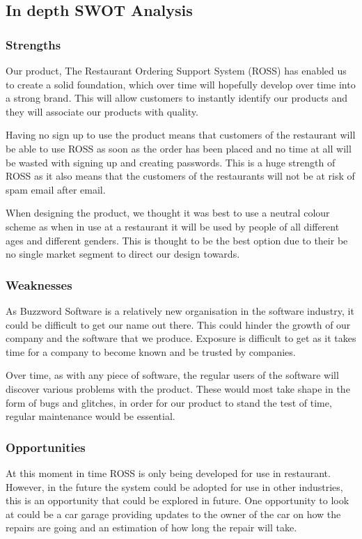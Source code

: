 \documentclass[11pt, oneside, a4paper]{report}   %
\begin{document}
\begin{flushleft}
\subsection{In depth SWOT Analysis}
\subsubsection{Strengths}
Our product, The Restaurant Ordering Support System (ROSS) has enabled us to create a solid foundation, which over time will hopefully develop over time into a strong brand. This will allow customers to instantly identify our products and they will associate our products with quality. 

Having no sign up to use the product means that customers of the restaurant will be able to use ROSS as soon as the order has been placed and no time at all will be wasted with signing up and creating passwords. This is a huge strength of ROSS as it also means that the customers of the restaurants will not be at risk of spam email after email. 

When designing the product, we thought it was best to use a neutral colour scheme as when in use at a restaurant it will be used by people of all different ages and different genders. This is thought to be the best option due to their be no single market segment to direct our design towards. 

\subsubsection{Weaknesses}
As Buzzword Software is a relatively new organisation in the software industry, it could be difficult to get our name out there. This could hinder the growth of our company and the software that we produce. Exposure is difficult to get as it takes time for a company to become known and be trusted by companies. 

Over time, as with any piece of software, the regular users of the software will discover various problems with the product. These would most take shape in the form of bugs and glitches, in order for our product to stand the test of time, regular maintenance would be essential. 

\subsubsection{Opportunities}
At this moment in time ROSS is only being developed for use in restaurant. However, in the future the system could be adopted for use in other industries, this is an opportunity that could be explored in future. One opportunity to look at could be a car garage providing updates to the owner of the car on how the repairs are going and an estimation of how long the repair will take. 


\end{flushleft}
\end{document}
